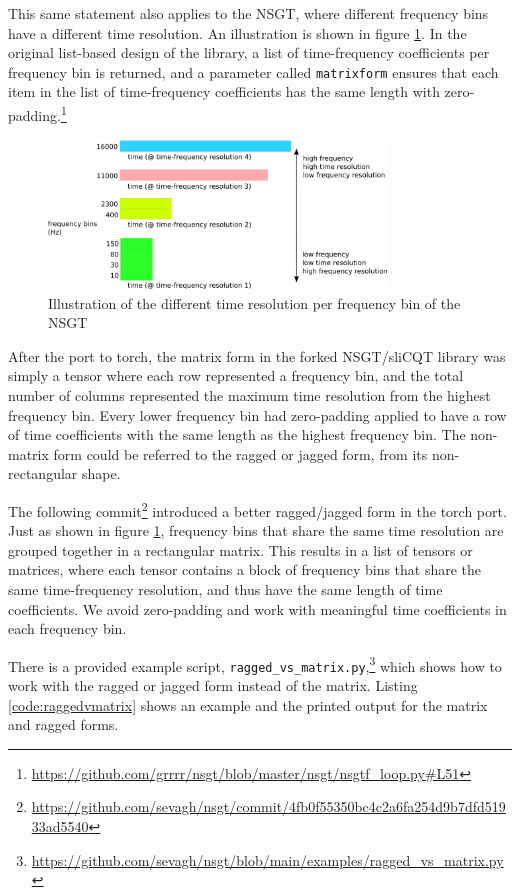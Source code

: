 \documentclass[report.tex]{subfiles}
\begin{document}
This same statement also applies to the NSGT, where different frequency bins have a different time resolution. An illustration is shown in figure \ref{fig:raggedslicqt}. In the original list-based design of the library, a list of time-frequency coefficients per frequency bin is returned, and a parameter called \Verb#matrixform# ensures that each item in the list of time-frequency coefficients has the same length with zero-padding.\footnote{\url{https://github.com/grrrr/nsgt/blob/master/nsgt/nsgtf_loop.py\#L51}}

\begin{figure}[ht]
	\centering
	\includegraphics[width=0.8\textwidth]{./images-misc/slicq_shape.png}
	\caption{Illustration of the different time resolution per frequency bin of the NSGT}
	\label{fig:raggedslicqt}
\end{figure}

After the port to torch, the matrix form in the forked NSGT/sliCQT library was simply a tensor where each row represented a frequency bin, and the total number of columns represented the maximum time resolution from the highest frequency bin. Every lower frequency bin had zero-padding applied to have a row of time coefficients with the same length as the highest frequency bin. The non-matrix form could be referred to the ragged or jagged form, from its non-rectangular shape.

The following commit\footnote{\url{https://github.com/sevagh/nsgt/commit/4fb0f55350bc4c2a6fa254d9b7dfd51933ad5540}} introduced a better ragged/jagged form in the torch port. Just as shown in figure \ref{fig:raggedslicqt}, frequency bins that share the same time resolution are grouped together in a rectangular matrix. This results in a list of tensors or matrices, where each tensor contains a block of frequency bins that share the same time-frequency resolution, and thus have the same length of time coefficients. We avoid zero-padding and work with meaningful time coefficients in each frequency bin.

There is a provided example script, \Verb#ragged_vs_matrix.py#,\footnote{\url{https://github.com/sevagh/nsgt/blob/main/examples/ragged_vs_matrix.py}} which shows how to work with the ragged or jagged form instead of the matrix. Listing \ref{code:raggedvmatrix} shows an example and the printed output for the matrix and ragged forms.
\end{document}
